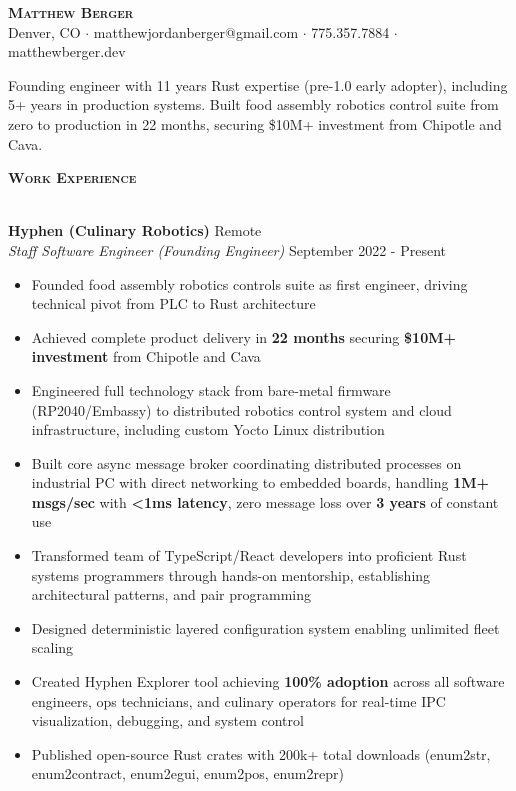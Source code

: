 \documentclass[a4paper]{article}
\newcommand{\lineunder} {
    \vspace*{-8pt} \\
    \hspace*{-18pt} \hrulefill \\
}
\newcommand{\header} [1] {
    {\hspace*{-18pt}\vspace*{6pt} \large \textbf{\textsc{#1}}}
    \vspace*{-6pt} \lineunder
    \vspace*{4pt}
}
\begin{document}
\vspace*{-40pt}

\begin{center}
    {\Huge \scshape \textbf{Matthew Berger}}\\
    \vspace*{4pt}
    Denver, CO $\cdot$ matthewjordanberger@gmail.com $\cdot$ 775.357.7884 $\cdot$ matthewberger.dev\\
\end{center}

\vspace*{-6pt}
Founding engineer with 11 years Rust expertise (pre-1.0 early adopter), including 5+ years in production systems. Built food assembly robotics control suite from zero to production in 22 months, securing \$10M+ investment from Chipotle and Cava.
\vspace*{8pt}

\header{Work Experience}

\textbf{Hyphen (Culinary Robotics)} \hfill Remote\\
\textit{Staff Software Engineer (Founding Engineer)} \hfill September 2022 - Present\\
\vspace{-1mm}
\begin{itemize} \itemsep 1pt
    \item Founded food assembly robotics controls suite as first engineer, driving technical pivot from PLC to Rust architecture
    \item Achieved complete product delivery in \textbf{22 months} securing \textbf{\$10M+ investment} from Chipotle and Cava
    \item Engineered full technology stack from bare-metal firmware (RP2040/Embassy) to distributed robotics control system and cloud infrastructure, including custom Yocto Linux distribution
    \item Built core async message broker coordinating distributed processes on industrial PC with direct networking to embedded boards, handling \textbf{1M+ msgs/sec} with \textbf{<1ms latency}, zero message loss over \textbf{3 years} of constant use
    \item Transformed team of TypeScript/React developers into proficient Rust systems programmers through hands-on mentorship, establishing architectural patterns, and pair programming
    \item Designed deterministic layered configuration system enabling unlimited fleet scaling
    \item Created Hyphen Explorer tool achieving \textbf{100\% adoption} across all software engineers, ops technicians, and culinary operators for real-time IPC visualization, debugging, and system control
    \item Published open-source Rust crates with 200k+ total downloads (enum2str, enum2contract, enum2egui, enum2pos, enum2repr)
\end{itemize}
\end{document}
